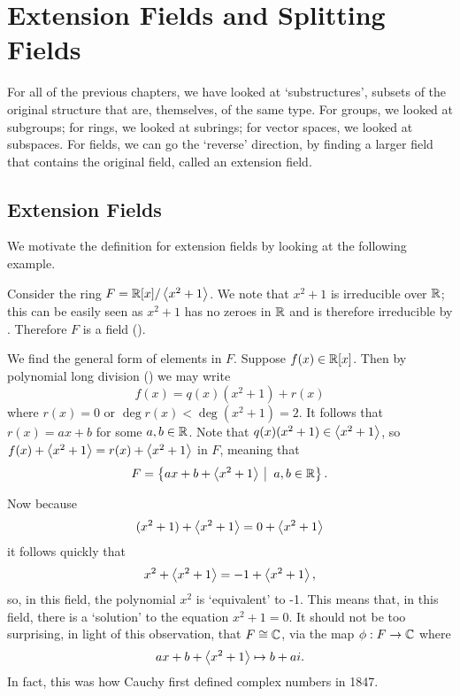 \chapter{Extension Fields and Splitting Fields}
For all of the previous chapters, we have looked at `substructures', subsets of the original structure that are, themselves, of the same type. For groups, we looked at subgroups; for rings, we looked at subrings; for vector spaces, we looked at subspaces. For fields, we can go the `reverse' direction, by finding a larger field that contains the original field, called an extension field.

\section{Extension Fields}
We motivate the definition for extension fields by looking at the following example.

\begin{example}\label{example-R[x]-mod-x^2+1-is-isomorphic-to-C}
    Consider the ring $F = \mathbb{R}[x]/\left\langle x^2+1\right\rangle$. We note that $x^2 + 1$ is irreducible over $\mathbb{R}$; this can be easily seen as $x^2+1$ has no zeroes in $\mathbb{R}$ and is therefore irreducible by . Therefore $F$ is a field ().

    We find the general form of elements in $F$. Suppose $f(x) \in \mathbb{R}[x]$. Then by polynomial long division () we may write
    \[
        f(x) = q(x)(x^2+1) + r(x)
    \]
    where $r(x) = 0$ or $\deg r(x) < \deg(x^2+1) = 2$. It follows that $r(x) = ax + b$ for some $a, b \in \mathbb{R}$. Note that $q(x)(x^2+1) \in \left\langle x^2+1\right\rangle$, so $f(x) + \left\langle x^2+1\right\rangle = r(x) + \left\langle x^2+1\right\rangle$ in $F$, meaning that
    \[
        F = \left\{ax + b + \princ{x^2+1} \vert a,b\in \R\right\}.
    \]

    Now because
    \[
        (x^2 + 1) + \left\langle x^2 + 1\right\rangle = 0 + \left\langle x^2+1\right\rangle
    \]
    it follows quickly that
    \[
        x^2 + \left\langle x^2 + 1\right\rangle = -1 + \left\langle x^2+1\right\rangle,
    \]
    so, in this field, the polynomial $x^2$ is `equivalent' to -1. This means that, in this field, there is a `solution' to the equation $x^2 + 1 = 0$. It should not be too surprising, in light of this observation, that $F \cong \mathbb{C}$, via the map $\phi: F \to \mathbb{C}$ where
    \[
        ax + b + \left\langle x^2 + 1\right\rangle \mapsto b + ai.
    \]
    In fact, this was how Cauchy first defined complex numbers in 1847.
\end{example}

